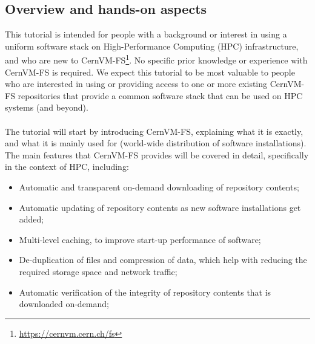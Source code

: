

\subsection*{Overview and hands-on aspects}

This tutorial is intended for people with a background or interest in using a uniform software stack on
High-Performance Computing (HPC) infrastructure, %
and who are new to CernVM-FS\footnote{\href{https://cernvm.cern.ch/fs}{https://cernvm.cern.ch/fs}}.
No specific prior knowledge or experience with CernVM-FS is required.
We expect this tutorial to be most valuable to people who are interested in using or providing access to one or more existing
CernVM-FS repositories that provide a common software stack that can be used on HPC systems (and beyond).

\paragraph{} 
The tutorial will start by introducing CernVM-FS, explaining what it is exactly, and what it is mainly used for
(world-wide distribution of software installations). The main features that CernVM-FS provides will be covered in detail,
specifically in the context of HPC, including:
\begin{itemize}
\item Automatic and transparent on-demand downloading of repository contents;
\item Automatic updating of repository contents as new software installations get added;
\item Multi-level caching, to improve start-up performance of software;
\item De-duplication of files and compression of data, which help with reducing the required storage space and network traffic;
\item Automatic verification of the integrity of repository contents that is downloaded on-demand;
\end{itemize}

